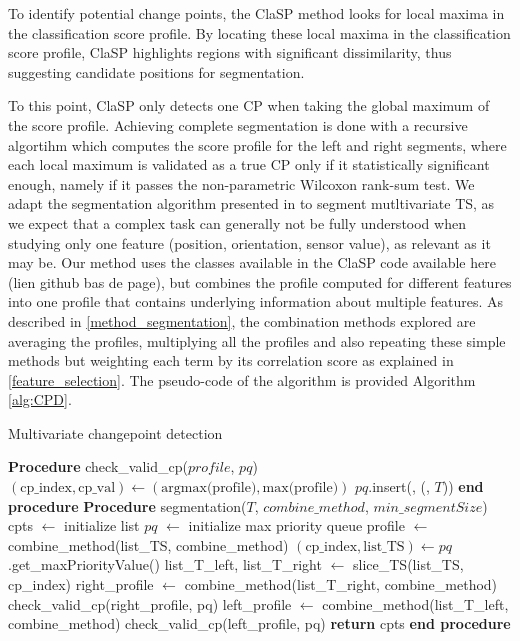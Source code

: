 \documentclass[conference]{IEEEtran}
\begin{document}
To identify potential change points, the ClaSP method looks for local maxima in the classification score profile. By locating these local maxima in the classification score profile, ClaSP highlights regions with significant dissimilarity, thus suggesting candidate positions for segmentation. 

To this point, ClaSP only detects one CP when taking the global maximum of the score profile. Achieving complete segmentation is done with a recursive algortihm which computes the score profile for the left and right segments, where each local maximum is validated as a true CP only if it statistically significant enough, namely if it passes the non-parametric Wilcoxon rank-sum test. We adapt the segmentation algorithm presented in \cite{clasp} to segment mutltivariate TS, as we expect that a complex task can generally not be fully understood when studying only one feature (position, orientation, sensor value), as relevant as it may be. Our method uses the classes available in the ClaSP code available here (lien github bas de page), but combines the profile computed for different features into one profile that contains underlying information about multiple features. As described in \ref{method_segmentation}, the combination methods explored are averaging the profiles, multiplying all the profiles and also repeating these simple methods but weighting each term by its correlation score as explained in \ref{feature_selection}. The pseudo-code of the algorithm is provided Algorithm \ref{alg:CPD}.


\begin{algorithm}
 \caption{Multivariate changepoint detection}
\begin{algorithmic}[1]
    \STATE \textbf{Procedure} check\_valid\_cp($profile$, $pq$)
    \STATE $(\text{cp\_index}, \text{cp\_val}) \leftarrow (\text{argmax(profile)}, \text{max(profile)})$
        \STATE $pq$.insert(, (, $T$))
    \ENDIF
    \STATE \textbf{end procedure}
    \STATE
    \STATE \textbf{Procedure} segmentation($T$, $combine\_method$, $min\_segmentSize$)
    \STATE cpts $\leftarrow$ initialize list
    \STATE $pq$ $\leftarrow$ initialize max priority queue
    \STATE profile $\leftarrow$ combine\_method(list\_TS, combine\_method)
        \STATE $(\text{cp\_index}, \text{list\_TS}) \leftarrow pq$.get\_maxPriorityValue()
        \STATE list\_T\_left, list\_T\_right $\leftarrow$ slice\_TS(list\_TS, cp\_index)
            \STATE right\_profile $\leftarrow$ combine\_method(list\_T\_right, combine\_method)
            \STATE check\_valid\_cp(right\_profile, pq)
        \ENDIF
            \STATE left\_profile $\leftarrow$ combine\_method(list\_T\_left, combine\_method)
            \STATE check\_valid\_cp(left\_profile, pq)
        \ENDIF
        \STATE
    \ENDWHILE
    \STATE \textbf{return} cpts
    \STATE \textbf{end procedure}
\end{algorithmic}
 \label{alg:CPD}
\end{algorithm}
\end{document}
